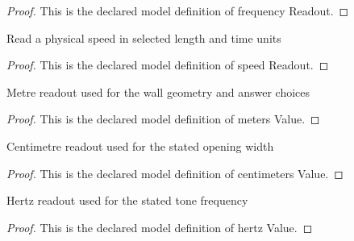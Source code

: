 \begin{proof}
  This is the declared model definition of frequency Readout.
\end{proof}
\begin{definition}
  \label{def:physics:phyx-mini-0175:phyxminiproblems-problemphyxmini0175-speedreadout}
  Read a physical speed in selected length and time units
\end{definition}
\begin{proof}
  This is the declared model definition of speed Readout.
\end{proof}
\begin{definition}
  \label{def:physics:phyx-mini-0175:phyxminiproblems-problemphyxmini0175-metersvalue}
  Metre readout used for the wall geometry and answer choices
\end{definition}
\begin{proof}
  This is the declared model definition of meters Value.
\end{proof}
\begin{definition}
  \label{def:physics:phyx-mini-0175:phyxminiproblems-problemphyxmini0175-centimetersvalue}
  Centimetre readout used for the stated opening width
\end{definition}
\begin{proof}
  This is the declared model definition of centimeters Value.
\end{proof}
\begin{definition}
  \label{def:physics:phyx-mini-0175:phyxminiproblems-problemphyxmini0175-hertzvalue}
  Hertz readout used for the stated tone frequency
\end{definition}
\begin{proof}
  This is the declared model definition of hertz Value.
\end{proof}

